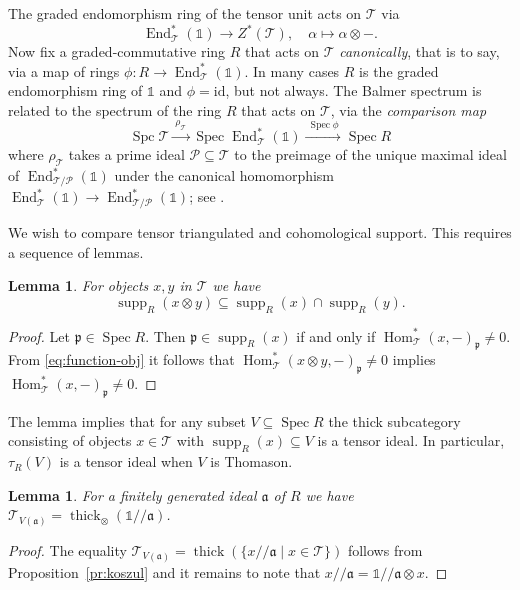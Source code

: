 \documentclass{amsart}[a4]
\newtheorem{lemma}[theorem]{Lemma}
\theoremstyle{definition}
\theoremstyle{remark}
\numberwithin{equation}{section}
\newcommand{\End}{\operatorname{End}}
\newcommand{\Hom}{\operatorname{Hom}}
\newcommand{\Spc}{\operatorname{Spc}}
\newcommand{\Spec}{\operatorname{Spec}}
\newcommand{\supp}{\operatorname{supp}}
\newcommand{\thick}{\operatorname{thick}}
\newcommand{\kos}[2]{{#1}/\!\!/{#2}}
\newcommand{\lto}{\longrightarrow}
\newcommand{\cat}{\mathcal}
\newcommand{\one}{\mathds 1}
\newcommand{\fa}{\mathfrak{a}}
\newcommand{\fp}{\mathfrak{p}}
\begin{document}
The graded endomorphism ring of the tensor unit acts on $\cat T$
via
\[\End^*_{\cat T}(\one)\lto Z^* (\cat T),\quad
  \alpha\longmapsto\alpha\otimes -.\]
Now fix a graded-commutative ring $R$ that acts on $\cat T$
\emph{canonically}, that is to say, via a map of rings
$\phi\colon R\to \End^*_{\cat T}(\one)$. In many cases $R$ is the
graded endomorphism ring of $\one$ and $\phi=\mathrm{id}$, but not
always. The Balmer spectrum is related to the spectrum of the ring $R$
that acts on $\cat T$, via the \emph{comparison map}
\begin{equation}
\label{eq:bs-zs}
\Spc\cat T\xrightarrow{\ \rho_{\cat T}\ } \Spec \End^*_{\cat T}(\one)\xrightarrow{\ \Spec\phi\ } \Spec R
\end{equation}
where $\rho_{\cat T}$ takes a prime ideal $\cat P\subseteq\cat T$ to
the preimage of the unique maximal ideal of
$\End^*_{\cat T/\cat P}(\one)$ under the canonical homomorphism
$\End^*_{\cat T}(\one)\to \End^*_{\cat T/\cat P}(\one)$; see
\cite{Balmer:2010b}.

We wish to compare  tensor triangulated and  cohomological
support. This requires a sequence of lemmas.

\begin{lemma}
  For  objects  $x,y$ in $\cat T$ we have
  \[\supp_R(x\otimes y)\subseteq\supp_R(x)\cap\supp_R(y).\]
\end{lemma}
\begin{proof}
  Let $\fp\in\Spec R$. Then $\fp\in\supp_R(x)$ if and only if
  $\Hom^*_\cat T(x,-)_\fp\neq 0$.  From \eqref{eq:function-obj} it
  follows that $\Hom^*_\cat T(x\otimes y,-)_\fp\neq 0$ implies
  $\Hom^*_\cat T(x,-)_\fp\neq 0$.
\end{proof}


The lemma implies that for any subset $V\subseteq \Spec R$ the thick
subcategory consisting of objects $x\in\cat T$ with $\supp_R(x)\subseteq V$ is a
tensor ideal. In particular, $\tau_R(V)$ is a tensor ideal when $V$ is Thomason.

\begin{lemma}\label{le:koszul}
For a finitely generated ideal $\fa$ of $R$ we have $\cat T_{V(\fa)}=\thick_\otimes(\kos{\one}{\fa})$.
\end{lemma}
\begin{proof}
  The equality
  $\cat T_{V(\fa)}=\thick(\{\kos{x}{\fa}\mid x\in\cat T\})$ follows from
  Proposition~\ref{pr:koszul} and it remains
  to note that $\kos{x}{\fa}= \kos{\one}{\fa}\otimes x$.
\end{proof}
\end{document}
